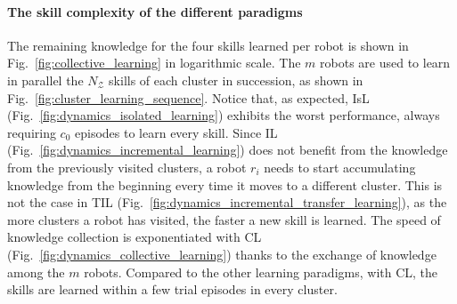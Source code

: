 \documentclass[12pt]{article}
\begin{document}
\paragraph*{The skill complexity of the different paradigms}
The remaining knowledge for the four skills learned per robot is shown in Fig.~\ref{fig:collective_learning} in logarithmic scale. The $m$ robots are used to learn in parallel the $N_\mathcal{Z}$ skills of each cluster in succession, as shown in Fig.~\ref{fig:cluster_learning_sequence}. Notice that, as expected, IsL (Fig.~\ref{fig:dynamics_isolated_learning}) exhibits the worst performance, always requiring $c_0$ episodes to learn every skill. Since IL (Fig.~\ref{fig:dynamics_incremental_learning}) does not benefit from the knowledge from the previously visited clusters, a robot $r_i$ needs to start accumulating knowledge from the beginning every time it moves to a different cluster. This is not the case in TIL (Fig.~\ref{fig:dynamics_incremental_transfer_learning}), as the more clusters a robot has visited, the faster a new skill is learned. The speed of knowledge collection is exponentiated with CL (Fig.~\ref{fig:dynamics_collective_learning}) thanks to the exchange of knowledge among the $m$ robots. Compared to the other learning paradigms, with CL, the skills are learned within a few trial episodes in every cluster. 
\end{document}
